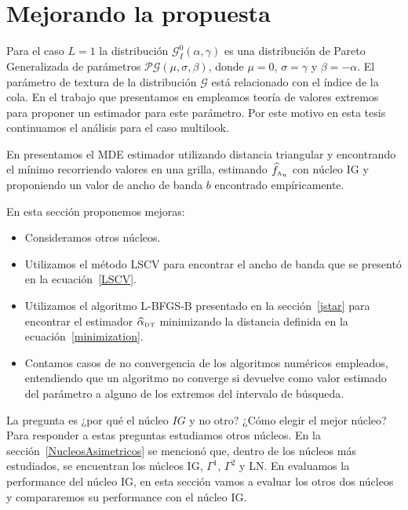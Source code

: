 \section{Mejorando la propuesta}
\label{mejorando}

Para el caso $L=1$ la distribución $\mathcal{G}_I^0(\alpha,\gamma)$ es una distribución de Pareto Generalizada de parámetros $\mathcal{PG}(\mu,\sigma,\beta)$, donde $\mu=0$, $\sigma=\gamma$ y $\beta=-\alpha$. El parámetro de textura de la distribución $\mathcal{G}$ está relacionado con el índice de la cola. En el trabajo que presentamos en \citet{Chan2016} empleamos teoría de valores extremos para proponer un estimador para este parámetro. Por este motivo en esta tesis continuamos el análisis para el caso multilook.

En \citet{gambini2015} presentamos el MDE estimador utilizando distancia triangular y encontrando el mínimo recorriendo valores en una grilla, estimando $\widehat{f}_{\text{\tiny{A}}_n}$ con núcleo IG y proponiendo un valor de ancho de banda $b$ encontrado empíricamente.

En esta sección proponemos mejoras:

\begin{itemize}
	\item Consideramos otros núcleos.%
	\item Utilizamos el método LSCV para encontrar el ancho de banda que se presentó en la ecuación~\eqref{LSCV}.
	\item Utilizamos el algoritmo L-BFGS-B presentado en la sección~\ref{jstar} para encontrar el estimador $\widehat{\alpha}_{\text{\tiny{DT}}}$ minimizando la distancia definida en la ecuación~\eqref{minimization}.
	\item Contamos casos de no convergencia de los algoritmos numéricos empleados, entendiendo que un algoritmo no converge si devuelve como valor estimado del parámetro a alguno de los extremos del intervalo de búsqueda.
\end{itemize}  

La pregunta es ¿por qué el núcleo $IG$ y no otro? ¿Cómo elegir el mejor núcleo? Para responder a estas preguntas estudiamos otros núcleos. En la sección~\ref{NucleosAsimetricos} se mencionó que, dentro de los núcleos más estudiados, se encuentran los núcleos IG, $\Gamma^1$, $\Gamma^2$ y LN. En \citet{gambini2015} evaluamos la performance del núcleo IG, en esta sección vamos a evaluar los otros dos núcleos y compararemos su performance con el núcleo IG. 

